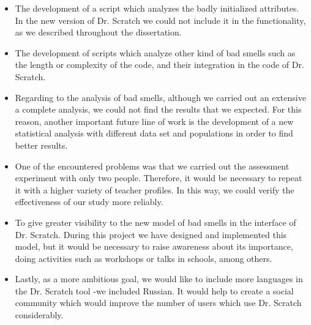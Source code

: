 \begin{itemize}
    \item The development of a script which analyzes the badly initialized attributes. In the new version of Dr. Scratch we could not include it in the functionality, as we described throughout the dissertation. 
    \item The development of scripts which analyze other kind of bad smells such as the length or complexity of the code, and their integration in the code of Dr. Scratch. 
    \item Regarding to the analysis of bad smells, although we carried out an extensive a complete analysis, we could not find the results that we expected. For this reason, another important future line of work is the development of a new statistical analysis with different data set and populations in order to find better results. 
    \item One of the encountered problems was that we carried out the assessment experiment with only two people. Therefore, it would be necessary to repeat it with a higher variety of teacher profiles. In this way, we could verify the effectiveness of our study more reliably.
    \item To give greater visibility to the new model of bad smells in the interface of Dr. Scratch. During this project we have designed and implemented this model, but it would be necessary to raise awareness about its importance, doing activities such as workshops or talks in schools, among others.
    \item Lastly, as a more ambitious goal, we would like to include more languages in the Dr. Scratch tool -we included Russian. It would help to create a social community which would improve the number of users which use Dr. Scratch considerably. 
\end{itemize}
